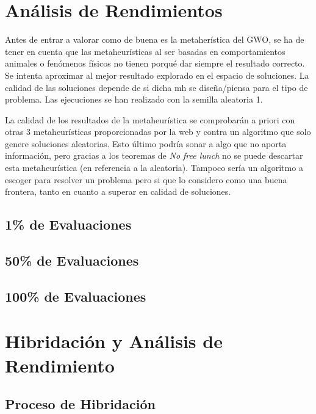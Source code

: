 \documentclass[a4paper, 12.5pt]{report}
\begin{document}
    \section{Análisis de Rendimientos}

    Antes de entrar a valorar como de buena es la metaherística del GWO, se ha de tener en cuenta que las metaheurísticas al ser basadas en comportamientos animales o fenómenos físicos no tienen porqué dar siempre el resultado correcto.
    Se intenta aproximar al mejor resultado explorado en el espacio de soluciones.     La calidad de las soluciones depende de si dicha mh se diseña/piensa para el tipo de problema. Las ejecuciones se han realizado con la semilla aleatoria 1.

    La calidad de los resultados de la metaheurística se comprobarán a priori con otras 3 metaheurísticas proporcionadas por la web  y contra un algoritmo que solo genere soluciones aleatorias.     Esto último podría sonar a algo que no aporta información, pero gracias a los teoremas de \textit{No free lunch} no se puede descartar esta metaheurística (en referencia a la aleatoria).     Tampoco sería un algoritmo a escoger para resolver un problema pero si que lo considero como una buena frontera, tanto en cuanto a superar en calidad de soluciones.



    \subsection{1\% de Evaluaciones}

    \subsection{50\% de Evaluaciones}

    \subsection{100\% de Evaluaciones}


    \section{Hibridación y Análisis de Rendimiento}

    \subsection{Proceso de Hibridación}
\end{document}
